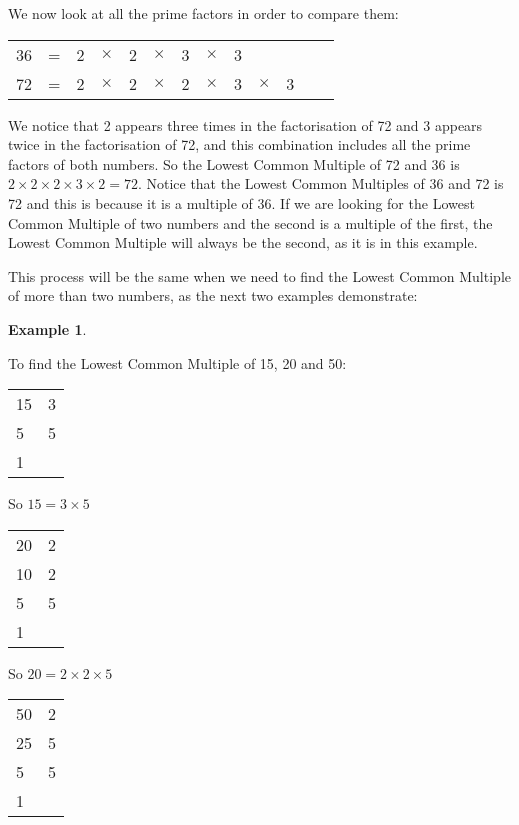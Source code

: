 \documentclass[11pt, oneside]{article}
\theoremstyle{definition}
\newtheorem{exmp}{Example}[section]
\begin{document}
We now look at all the prime factors in order to compare them:

\begin{tabular}{c c c c c c c c c c c c c}
36 & = & 2 & $\times$ & 2 & $\times$ & 3 & $\times$ & 3 &  &  &  &  \\
72 & = & 2 & $\times$ & 2 & $\times$ & 2 & $\times $ & 3 & $\times$ & 3 &  & 
\end{tabular}

We notice that 2 appears three times in the factorisation of 72 and 3 appears twice in the factorisation of 72, and this combination includes all the prime factors of both numbers. So the Lowest Common Multiple of 72 and 36 is $2\times 2 \times 2 \times 3 \times 2 = 72$. Notice that the Lowest Common Multiples of 36 and 72 is 72 and this is because it is a multiple of 36. If we are looking for the Lowest Common Multiple of two numbers and the second is a multiple of the first, the Lowest Common Multiple will always be the second, as it is in this example.

This process will be the same when we need to find the Lowest Common Multiple of more than two numbers, as the next two examples demonstrate:

\begin{exmp} \end{exmp}
To find the Lowest Common Multiple of 15, 20 and 50:

\begin{tabular}{ p{0.5cm} | p{1.5cm}}
15 & 3  \\
5 & 5  \\
1 &  
\end{tabular}

So $15 = 3 \times 5$

\bigbreak

\begin{tabular}{ p{0.5cm} | p{1.5cm}}
20 & 2  \\
10 & 2  \\
5 & 5  \\
1 
\end{tabular}

So $20 = 2\times 2 \times 5$

\bigbreak

\begin{tabular}{ p{0.5cm} | p{1.5cm}}
50 & 2  \\
25 & 5  \\
5 & 5  \\
1 
\end{tabular}
\end{document}

